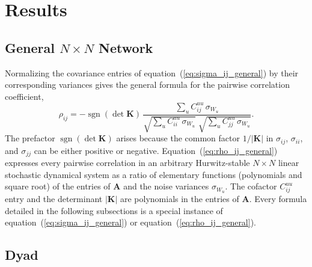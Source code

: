\documentclass[12pt]{article}
\begin{document}
\section*{Results}

\subsection*{General $N\times N$ Network}
Normalizing the covariance entries of
equation~(\ref{eq:sigma_ij_general}) by their corresponding
variances gives the general formula for the pairwise correlation coefficient,
\begin{equation}
\rho_{ij}=-\operatorname{sgn}(\det\mathbf{K})\,\frac{
  \sum_{u}C_{ij}^{uu}\,\sigma_{W_{u}}
}{
  \sqrt{\sum_{u}C_{ii}^{uu}\,\sigma_{W_{u}}}\;
  \sqrt{\sum_{u}C_{jj}^{uu}\,\sigma_{W_{u}}}
}.
\label{eq:rho_ij_general}
\end{equation}
The prefactor $\operatorname{sgn}(\det\mathbf{K})$ arises because the common factor
$1/|\mathbf{K}|$ in $\sigma_{ij}$, $\sigma_{ii}$, and $\sigma_{jj}$ can be either positive or negative. Equation~(\ref{eq:rho_ij_general}) expresses every pairwise correlation in an arbitrary
Hurwitz-stable $N\times N$ linear stochastic dynamical system as
a ratio of elementary functions (polynomials and square root) of the entries of $\mathbf{A}$ and the noise variances $\sigma_{W_u}$.
The cofactor $C_{ij}^{uu}$ entry and the determinant $|\mathbf{K}|$
are polynomials in the entries of $\mathbf{A}$.
Every formula detailed in the following subsections is a
special instance of
equation~(\ref{eq:sigma_ij_general}) or equation~(\ref{eq:rho_ij_general}).

\subsection*{Dyad}
\end{document}
